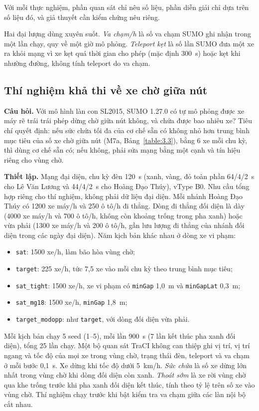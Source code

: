\documentclass[../DoAn.tex]{subfiles}
\begin{document}
Với mỗi thực nghiệm, phần quan sát chỉ nêu số liệu, phần diễn giải chỉ dựa trên số liệu đó, và giả thuyết cần kiểm chứng nêu riêng.

Hai đại lượng dùng xuyên suốt. \emph{Va chạm/h} là số va chạm SUMO ghi nhận trong một lần chạy, quy về một giờ mô phỏng. \emph{Teleport kẹt} là số lần SUMO đưa một xe ra khỏi mạng vì xe kẹt quá thời gian cho phép (mặc định 300~s) hoặc kẹt khi nhường đường, không tính teleport do va chạm.

\subsection{Thí nghiệm khả thi về xe chờ giữa nút}
\label{section:box_capacity}

\textbf{Câu hỏi.} Với mô hình làn con SL2015, SUMO 1.27.0 có tự mô phỏng được xe máy rẽ trái trái phép dừng chờ giữa nút không, và chứa được bao nhiêu xe? Tiêu chí quyết định: nếu sức chứa tối đa của cơ chế sẵn có không nhỏ hơn trung bình mục tiêu của số xe chờ giữa nút (M7a, Bảng~\ref{table:3.3}), bằng 6 xe mỗi chu kỳ, thì dùng cơ chế sẵn có; nếu không, phải sửa mạng bằng một cạnh và tín hiệu riêng cho vùng chờ.

\textbf{Thiết lập.} Mạng đại diện, chu kỳ đèn 120~s (xanh, vàng, đỏ toàn phần 64/4/2~s cho Lê Văn Lương và 44/4/2~s cho Hoàng Đạo Thúy), vType B0. Nhu cầu tổng hợp riêng cho thí nghiệm, không phải dữ liệu đại diện. Mỗi nhánh Hoàng Đạo Thúy có 1200 xe máy/h và 250 ô tô/h đi thẳng. Dòng đi thẳng đối diện là dày (4000 xe máy/h và 700 ô tô/h, không còn khoảng trống trong pha xanh) hoặc vừa phải (1300 xe máy/h và 200 ô tô/h, gần lưu lượng đi thẳng của nhánh đối diện trong các ngày đại diện). Năm kịch bản khác nhau ở dòng xe vi phạm:
\begin{itemize}
    \item \texttt{sat}: 1500 xe/h, làm bão hòa vùng chờ;
    \item \texttt{target}: 225 xe/h, tức 7,5 xe vào mỗi chu kỳ theo trung bình mục tiêu;
    \item \texttt{sat\_tight}: 1500 xe/h, xe vi phạm có \texttt{minGap} 1,0~m và \texttt{minGapLat} 0,3~m;
    \item \texttt{sat\_mg18}: 1500 xe/h, \texttt{minGap} 1,8~m;
    \item \texttt{target\_modopp}: như \texttt{target}, với dòng đối diện vừa phải.
\end{itemize}
Mỗi kịch bản chạy 5 seed (1--5), mỗi lần 900~s (7 lần kết thúc pha xanh đối diện), tổng 25 lần chạy. Một bộ quan sát TraCI không can thiệp ghi vị trí, vị trí ngang và tốc độ của mọi xe trong vùng chờ, trạng thái đèn, teleport và va chạm ở mỗi bước 0,1~s. Xe dừng khi tốc độ dưới 5~km/h. \emph{Sức chứa} là số xe dừng lớn nhất trong vùng chờ khi dòng đối diện còn xanh. \emph{Thoát sớm} là xe rời vùng chờ qua khe trống trước khi pha xanh đối diện kết thúc, tính theo tỷ lệ trên số xe vào vùng chờ. Thí nghiệm chạy trước khi bật kiểm tra va chạm giữa các làn nội bộ cắt nhau.
\end{document}
